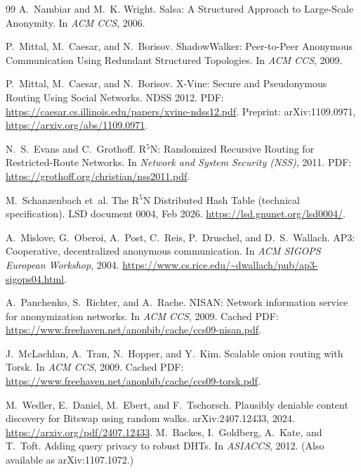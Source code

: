 \documentclass[11pt]{article}
\begin{document}
\begin{thebibliography}{99}
A.~Nambiar and M.~K. Wright.
\newblock Salsa: A Structured Approach to Large-Scale Anonymity.
\newblock In \emph{ACM CCS}, 2006.

P.~Mittal, M.~Caesar, and N.~Borisov.
\newblock ShadowWalker: Peer-to-Peer Anonymous Communication Using Redundant Structured Topologies.
\newblock In \emph{ACM CCS}, 2009.



P.~Mittal, M.~Caesar, and N.~Borisov.
\newblock X-Vine: Secure and Pseudonymous Routing Using Social Networks.
\newblock NDSS 2012.
\newblock PDF: \url{https://caesar.cs.illinois.edu/papers/xvine-ndss12.pdf}.
\newblock Preprint: arXiv:1109.0971, \url{https://arxiv.org/abs/1109.0971}.

N.~S.~Evans and C.~Grothoff.
\newblock R$^{5}$N: Randomized Recursive Routing for Restricted-Route Networks.
\newblock In \emph{Network and System Security (NSS)}, 2011.
\newblock PDF: \url{https://grothoff.org/christian/nss2011.pdf}.

M.~Schanzenbach et~al.
\newblock The R$^{5}$N Distributed Hash Table (technical specification).
\newblock LSD document 0004, Feb 2026.
\newblock \url{https://lsd.gnunet.org/lsd0004/}.


A.~Mislove, G.~Oberoi, A.~Post, C.~Reis, P.~Druschel, and D.~S.~Wallach.
\newblock AP3: Cooperative, decentralized anonymous communication.
\newblock In \emph{ACM SIGOPS European Workshop}, 2004.
\newblock \url{https://www.cs.rice.edu/~dwallach/pub/ap3-sigops04.html}.

A.~Panchenko, S.~Richter, and A.~Rache.
\newblock NISAN: Network information service for anonymization networks.
\newblock In \emph{ACM CCS}, 2009.
\newblock Cached PDF: \url{https://www.freehaven.net/anonbib/cache/ccs09-nisan.pdf}.

J.~McLachlan, A.~Tran, N.~Hopper, and Y.~Kim.
\newblock Scalable onion routing with Torsk.
\newblock In \emph{ACM CCS}, 2009.
\newblock Cached PDF: \url{https://www.freehaven.net/anonbib/cache/ccs09-torsk.pdf}.

M.~Wedler, E.~Daniel, M.~Ebert, and F.~Tschorsch.
\newblock Plausibly deniable content discovery for Bitswap using random walks.
\newblock arXiv:2407.12433, 2024.
\newblock \url{https://arxiv.org/pdf/2407.12433}.
M.~Backes, I.~Goldberg, A.~Kate, and T.~Toft.
\newblock Adding query privacy to robust DHTs.
\newblock In \emph{ASIACCS}, 2012. (Also available as arXiv:1107.1072.)


\end{thebibliography}
\end{document}

